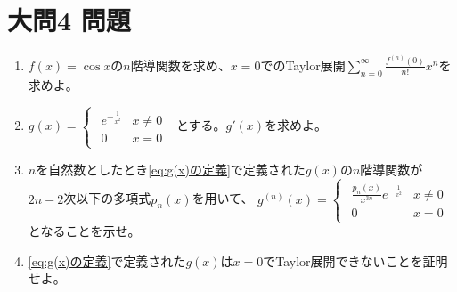 \documentclass[dvipdfmx]{jsreport}
\begin{document}
\section{大問4 問題}
\begin{tcolorbox} %
\begin{enumerate}
	\item $f(x)= \cos{x}$の$n$階導関数を求め、$x= 0$でのTaylor展開$\sum_{n= 0}^\infty \frac{f^{(n)}(0)}{n!}x^n$を求めよ。
	\item\label{eq:g(x)の定義} $
	g(x)= 
\begin{cases}
\begin{matrix}
	e^{-\frac{1}{x^2}}& x\ne 0\\
	0& x= 0
\end{matrix}
\end{cases}
$
	とする。$g'(x)$を求めよ。
	\item $n$を自然数としたとき\eqref{eq:g(x)の定義}で定義された$g(x)$の$n$階導関数が$2n- 2$次以下の多項式$p_n(x)$を用いて、
$
	g^{(n)}(x)=
\begin{cases}
\begin{matrix}
	\frac{p_n(x)}{x^{3n}}e^{-\frac{1}{x^2}}& x\ne 0\\
	0& x= 0
\end{matrix}
\end{cases}
$
	となることを示せ。
	\item \eqref{eq:g(x)の定義}で定義された$g(x)$は$x= 0$でTaylor展開できないことを証明せよ。
\end{enumerate}
\end{tcolorbox}
\end{document}
